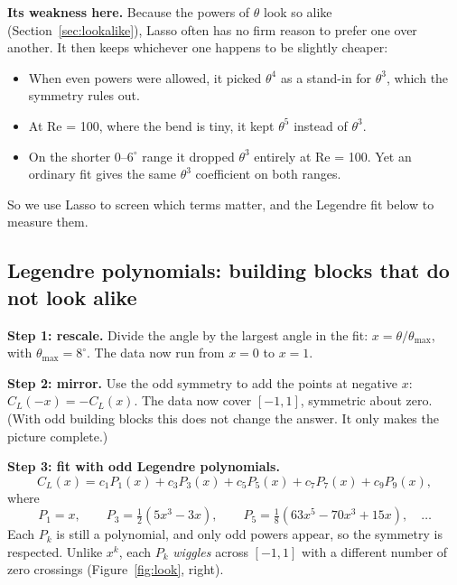 \documentclass[11pt,a4paper]{article}
\newcommand{\CL}{C_L}
\begin{document}
\textbf{Its weakness here.} Because the powers of $\theta$ look so alike
(Section~\ref{sec:lookalike}), Lasso often has no firm reason to prefer one over
another. It then keeps whichever one happens to be slightly cheaper:
\begin{itemize}[leftmargin=*]
\item When even powers were allowed, it picked $\theta^4$ as a stand-in for $\theta^3$,
  which the symmetry rules out.
\item At Re = 100, where the bend is tiny, it kept $\theta^5$ instead of $\theta^3$.
\item On the shorter $0$--$6^\circ$ range it dropped $\theta^3$ entirely at Re = 100.
  Yet an ordinary fit gives the same $\theta^3$ coefficient on both ranges.
\end{itemize}
So we use Lasso to screen which terms matter, and the Legendre fit below to measure
them.

\FloatBarrier
\subsection{Legendre polynomials: building blocks that do not look alike}
\label{sec:legendre}

\textbf{Step 1: rescale.} Divide the angle by the largest angle in the fit:
$x = \theta/\theta_{\max}$, with $\theta_{\max} = 8^\circ$. The data now run from
$x = 0$ to $x = 1$.

\textbf{Step 2: mirror.} Use the odd symmetry to add the points at negative $x$:
$\CL(-x) = -\CL(x)$. The data now cover $[-1, 1]$, symmetric about zero. (With odd
building blocks this does not change the answer. It only makes the picture complete.)

\textbf{Step 3: fit with odd Legendre polynomials.}
\[
  \CL(x) = c_1 P_1(x) + c_3 P_3(x) + c_5 P_5(x) + c_7 P_7(x) + c_9 P_9(x),
\]
where
\[
  P_1 = x, \qquad P_3 = \tfrac12(5x^3 - 3x), \qquad
  P_5 = \tfrac18(63x^5 - 70x^3 + 15x), \quad \dots
\]
Each $P_k$ is still a polynomial, and only odd powers appear, so the symmetry is
respected. Unlike $x^k$, each $P_k$ \emph{wiggles} across $[-1,1]$ with a different
number of zero crossings (Figure~\ref{fig:look}, right).
\end{document}

